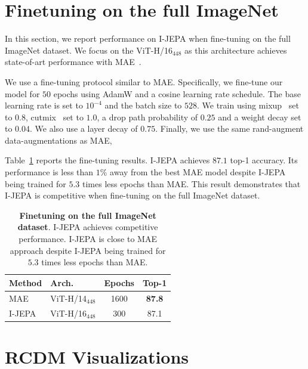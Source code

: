 \documentclass[10pt,twocolumn,letterpaper]{article}
\newcommand{\cc}{\cellcolor{fbApp}}
\newcommand{\putalg}{{I-JEPA}\xspace}
\begin{document}
\section{Finetuning on the full ImageNet}
In this section, we report performance on \putalg when fine-tuning on the full ImageNet dataset. We focus on the ViT-H/16$_{448}$ as this architecture achieves state-of-art performance with MAE~\cite{he2021masked}.

We use a fine-tuning protocol similar to MAE. Specifically, we fine-tune our model for $50$ epochs using AdamW and a cosine learning rate schedule. The base learning rate is set to $10^{-4}$ and the batch size to $528$. We train using  mixup~\cite{zhang2018mixup} set to $0.8$, cutmix~\cite{yun2019cutmix} set to $1.0$, a drop path probability of $0.25$ and a weight decay set to $0.04$. We also use a layer decay of $0.75$. Finally, we use the same rand-augment data-augmentations as MAE,

Table~\ref{tb:ablation-finetune} reports the fine-tuning results. \putalg achieves $87.1$ top-1 accuracy. Its performance is less than $1\%$ away from the best MAE model despite \putalg being trained for $5.3$ times less epochs than MAE.
This result demonstrates that \putalg is competitive when fine-tuning on the full ImageNet dataset.
\begin{table}[h]
     \centering
     \begin{tabular}{l l c c}
         \bf\small Method & \bf\small Arch. & \bf\small Epochs & \bf\small Top-1 \\
         \toprule
         \small MAE~\cite{he2021masked}  & \small ViT-H/14$_{448}$ & 1600 & \bf 87.8 \\
         \cc\small \putalg & \cc\small ViT-H/16$_{448}$ &  \cc300 &   \cc 87.1
     \end{tabular}
     \caption{\textbf{Finetuning on the full ImageNet dataset}.
       \putalg achieves competitive performance. \putalg is close to MAE approach despite \putalg being trained for $5.3$ times less epochs than MAE.}
     \label{tb:ablation-finetune}
\end{table}


\section{RCDM Visualizations}
\end{document}
